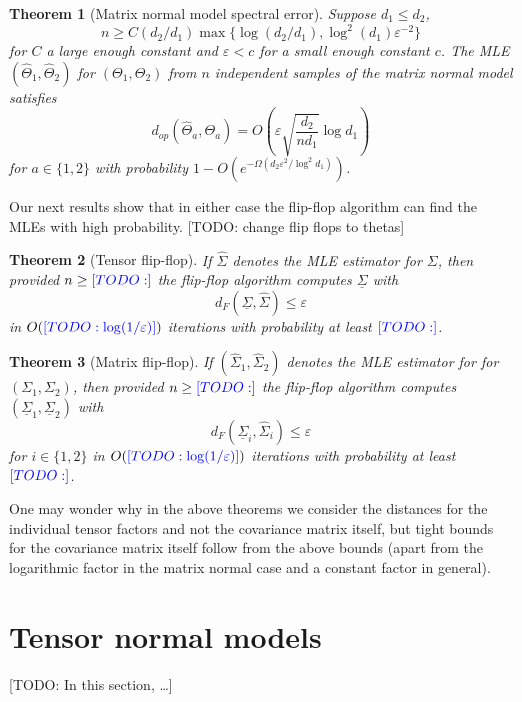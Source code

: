\documentclass{article}
\newtheorem{theorem}{Theorem}
\newcommand\eps{\varepsilon}
\newcommand{\TODO}[1]{{\color{blue}[TODO: #1]}}
\begin{document}
\begin{theorem}[Matrix normal model spectral error]\label{thm:matrix-normal} Suppose $d_1 \leq d_2$,
$$n \geq C (d_2/d_1) \max\{\log (d_2/d_1),  \log^2(d_1) \eps^{-2}\}$$ for $C$ a large enough constant and $\eps < c$ for a small enough constant $c$. The MLE $(\widehat{\Theta}_1,\widehat{\Theta}_2) $ for $(\Theta_1, \Theta_2)$ from $n$ independent samples of the matrix normal model satisfies
$$ d_{op}(\widehat{\Theta}_a, \Theta_a) = O\left(\eps \sqrt{\frac{d_2}{n d_1}} \log d_1\right) $$
for $a \in \{1,2\}$ with probability $1 - O(e^{ - \Omega( d_2 \eps^2/\log^2 d_1)})$.
\end{theorem}

Our next results show that in either case the flip-flop algorithm can find the MLEs with high probability. \TODO{change flip flops to thetas}

\begin{theorem}[Tensor flip-flop]\label{thm:tensor-flipflop} If $\hat{\Sigma}$ denotes the MLE estimator for $\Sigma$, then provided $n \geq \TODO{}$ the flip-flop algorithm computes $\underline{\Sigma}$ with
$$ d_F(\underline{\Sigma}, \hat{\Sigma}) \leq \eps $$
in $O(\TODO{\log(1/\eps)})$ iterations with probability at least $\TODO{}$.
\end{theorem}

\begin{theorem}[Matrix flip-flop]\label{thm:matrix-flipflop} If $(\hat{\Sigma}_1, \hat{\Sigma}_2) $ denotes the MLE estimator for for $(\Sigma_1, \Sigma_2)$, then provided $n \geq \TODO{}$ the flip-flop algorithm computes $(\underline{\Sigma}_1, \underline{\Sigma}_2)$ with
$$ d_F(\underline{\Sigma}_i, \hat{\Sigma}_i) \leq \eps $$
for $i \in \{1,2\}$ in $O(\TODO{\log(1/\eps)})$ iterations with probability at least $\TODO{}$.
\end{theorem}

One may wonder why in the above theorems we consider the distances for the individual tensor factors and not the covariance matrix itself, but tight bounds for the covariance matrix itself follow from the above bounds (apart from the logarithmic factor in the matrix normal case and a constant factor in general).

\section{Tensor normal models}

\TODO{In this section, \dots}
\end{document}
